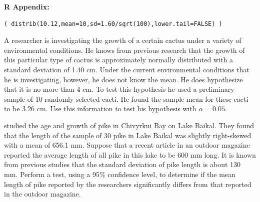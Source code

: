 \documentclass[10pt,openany]{book}\usepackage[]{graphicx}\usepackage[]{color}
\makeatletter
\newenvironment{kframe}{%
 \def\at@end@of@kframe{}%
 \ifinner\ifhmode%
  \def\at@end@of@kframe{\end{minipage}}%
  \begin{minipage}{\columnwidth}%
 \fi\fi%
 \def\FrameCommand##1{\hskip\@totalleftmargin \hskip-\fboxsep
 \colorbox{shadecolor}{##1}\hskip-\fboxsep
     \hskip-\linewidth \hskip-\@totalleftmargin \hskip\columnwidth}%
 \MakeFramed {\advance\hsize-\width
   \@totalleftmargin\z@ \linewidth\hsize
   \@setminipage}}%
 {\par\unskip\endMakeFramed%
 \at@end@of@kframe}
\newenvironment{knitrout}{}{} %
\makeatother
\begin{document}
\vspace{-8pt}
\begin{minipage}{\textwidth}
\textbf{R Appendix:}
\begin{knitrout}
\color{fgcolor}\begin{kframe}
\begin{verbatim}
( distrib(10.12,mean=10,sd=1.60/sqrt(100),lower.tail=FALSE) )
\end{verbatim}
\end{kframe}
\end{knitrout}
\end{minipage}

\vspace{-8pt}
\begin{exsection}
\vspace{-8pt}
  \item \label{revex:HypTestZCactus} A researcher is investigating the growth of a certain cactus under a variety of environmental conditions.  He knows from previous research that the growth of this particular type of cactus is approximately normally distributed with a standard deviation of 1.40 cm.  Under the current environmental conditions that he is investigating, however, he does not know the mean.  He does hypothesize that it is no more than 4 cm.  To test this hypothesis he used a preliminary sample of 10 randomly-selected cacti.  He found the sample mean for these cacti to be 3.26 cm.  Use this information to test his hypothesis with $\alpha=0.05$. 
  \item \label{revex:HypTestZPike} \cite{OwensPronin2000} studied the age and growth of pike in Chivyrkui Bay on Lake Baikal.  They found that the length of the sample of 30 pike in Lake Baikal was slightly right-skewed with a mean of 656.1 mm.  Suppose that a recent article in an outdoor magazine reported the average length of all pike in this lake to be 600 mm long.  It is known from previous studies that the standard deviation of pike length is about 130 mm.  Perform a test, using a 95\% confidence level, to determine if the mean length of pike reported by the researchers significantly differs from that reported in the outdoor magazine.  
\end{exsection}
\end{document}
